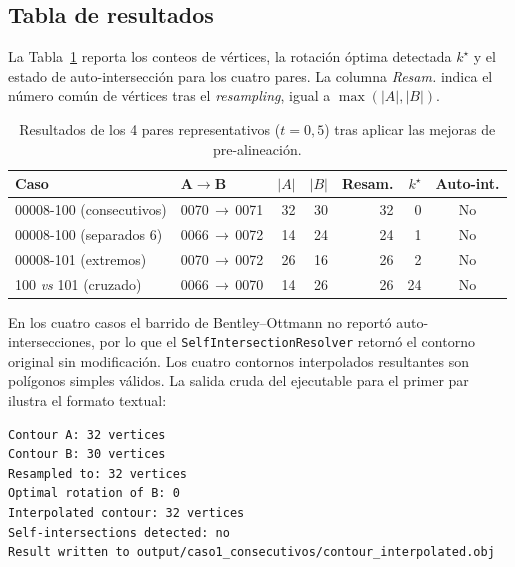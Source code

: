 \documentclass[conference]{IEEEtran}
\begin{document}
\subsection{Tabla de resultados}
\label{sec:resultados:tabla}
La Tabla~\ref{tab:resultados} reporta los conteos de
vértices, la rotación óptima detectada $k^{\star}$ y el
estado de auto-intersección para los cuatro pares. La
columna \emph{Resam.} indica el número común de vértices
tras el \textit{resampling}, igual a $\max(|A|,|B|)$.

\begin{table}[!t]
\centering
\caption{Resultados de los 4 pares representativos
($t = 0{,}5$) tras aplicar las mejoras de pre-alineación.}
\label{tab:resultados}
\renewcommand{\arraystretch}{1.15}
\setlength{\tabcolsep}{4pt}
\footnotesize
\begin{tabular}{@{}llrrrrc@{}}
\toprule
\textbf{Caso} & \textbf{A$\rightarrow$B} &
\textbf{$|A|$} & \textbf{$|B|$} & \textbf{Resam.} &
\textbf{$k^{\star}$} & \textbf{Auto-int.} \\
\midrule
00008-100 (consecutivos) & 0070\,$\rightarrow$\,0071 &
  32 & 30 & 32 & 0 & No \\
00008-100 (separados 6)  & 0066\,$\rightarrow$\,0072 &
  14 & 24 & 24 & 1 & No \\
00008-101 (extremos)     & 0070\,$\rightarrow$\,0072 &
  26 & 16 & 26 & 2 & No \\
100 \emph{vs} 101 (cruzado) & 0066\,$\rightarrow$\,0070 &
  14 & 26 & 26 & 24 & No \\
\bottomrule
\end{tabular}
\end{table}

En los cuatro casos el barrido de Bentley--Ottmann no
reportó auto-intersecciones, por lo que el
\texttt{SelfIntersectionResolver} retornó el contorno
original sin modificación. Los cuatro contornos
interpolados resultantes son polígonos simples válidos. La
salida cruda del ejecutable para el primer par ilustra el
formato textual:

\begin{lstlisting}[language=bash, numbers=none,
                   caption={Salida de \texttt{contour\_interpolator}
                   sobre dos slices consecutivos.}]
Contour A: 32 vertices
Contour B: 30 vertices
Resampled to: 32 vertices
Optimal rotation of B: 0
Interpolated contour: 32 vertices
Self-intersections detected: no
Result written to output/caso1_consecutivos/contour_interpolated.obj
\end{lstlisting}
\end{document}

